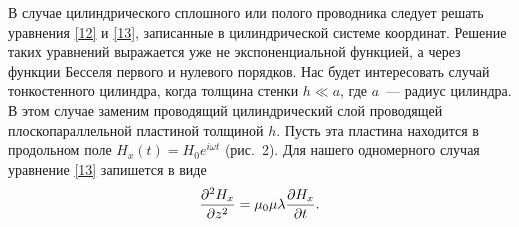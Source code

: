 



В случае цилиндрического сплошного или полого проводника следует решать уравнения \eqref{12} и \eqref{13}, записанные в
цилиндрической системе координат. Решение таких уравнений выражается уже не экспоненциальной функцией, а через функции
Бесселя первого и нулевого порядков. Нас будет интересовать случай тонкостенного цилиндра, когда толщина стенки $h\ll a$,
где $a$~--- радиус цилиндра. В этом случае заменим проводящий цилиндрический слой проводящей плоскопараллельной пластиной
толщиной $h$. Пусть эта пластина находится в продольном поле $H_x(t)=H_0e^{i\omega t}$ (рис.~2). Для нашего одномерного случая
уравнение \eqref{13} запишется в виде
\begin{equation} \eqmark{21}
\frac{\partial^2H_x}{\partial z^2}=\mu_0\mu\lambda\ddt{H_x}.
\end{equation}



